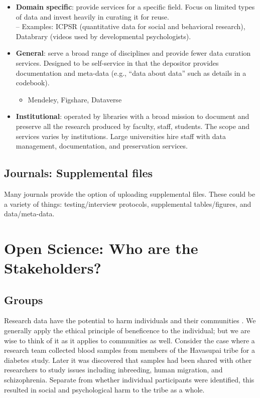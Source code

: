 \documentclass[
  english,
]{book}
\providecommand{\tightlist}{%
  \setlength{\itemsep}{0pt}\setlength{\parskip}{0pt}}
\begin{document}
\begin{itemize}
\tightlist
\item
  \textbf{Domain specific}: provide services for a specific field. Focus on limited types of data and invest heavily in curating it for reuse.\\
  -- Examples: ICPSR (quantitative data for social and behavioral research), Databrary (videos used by developmental psychologists).
\item
  \textbf{General}: serve a broad range of disciplines and provide fewer data curation services. Designed to be self-service in that the depositor provides documentation and meta-data (e.g., ``data about data'' such as details in a codebook).

  \begin{itemize}
  \tightlist
  \item
    Mendeley, Figshare, Dataverse
  \end{itemize}
\item
  \textbf{Institutional}: operated by libraries with a broad mission to document and preserve all the research produced by faculty, staff, students. The scope and services varies by institutions. Large universities hire staff with data management, documentation, and preservation services.
\end{itemize}

\hypertarget{journals-supplemental-files}{%
\subsection{Journals: Supplemental files}\label{journals-supplemental-files}}

Many journals provide the option of uploading supplemental files. These could be a variety of things: testing/interview protocols, supplemental tables/figures, and data/meta-data.

\hypertarget{open-science-who-are-the-stakeholders}{%
\section{Open Science: Who are the Stakeholders?}\label{open-science-who-are-the-stakeholders}}

\hypertarget{groups}{%
\subsection{Groups}\label{groups}}

Research data have the potential to harm individuals and their communities \citep{ross_ethical_2018}. We generally apply the ethical principle of beneficence to the individual; but we are wise to think of it as it applies to communities as well. Consider the case where a research team collected blood samples from members of the Havasupai tribe for a diabetes study. Later it was discovered that samples had been shared with other researchers to study issues including inbreeding, human migration, and schizophrenia. Separate from whether individual participants were identified, this resulted in social and psychological harm to the tribe as a whole.
\end{document}

